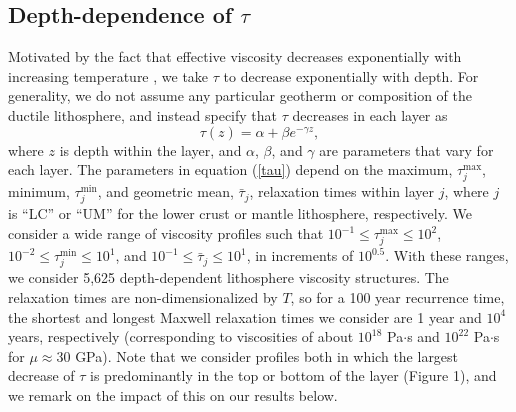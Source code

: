 \subsection{Depth-dependence of $\tau$}
Motivated by the fact that effective viscosity decreases exponentially with increasing temperature \citep[{\it e.g.},][]{Kohlstedt1995}, we take $\tau$ to decrease exponentially with depth. For generality, we do not assume any particular geotherm or composition of the ductile lithosphere, and instead specify that $\tau$ decreases in each layer as
\begin{equation}
\tau(z) = \alpha + \beta e^{-\gamma z},
\label{tau}
\end{equation}
where $z$ is depth within the layer, and $\alpha$, $\beta$, and $\gamma$ are parameters that vary for each layer.  The parameters in equation (\ref{tau}) depend on the maximum, $\tau_j^{\max}$, minimum, $\tau_j^{\min}$, and geometric mean, $\bar{\tau}_j$, relaxation times within layer $j$, where $j$ is ``LC'' or ``UM'' for the lower crust or mantle lithosphere, respectively.  We consider a wide range of viscosity profiles such that $10^{-1} \leq \tau_j^{\max} \leq 10^{2}$, $10^{-2} \leq \tau_j^{\min} \leq 10^{1}$, and $10^{-1} \leq \bar{\tau}_j \leq 10^{1}$, in increments of $10^{0.5}$.  With these ranges, we consider 5,625 depth-dependent lithosphere viscosity structures. The relaxation times are non-dimensionalized by $T$, so for a 100 year recurrence time, the shortest and longest Maxwell relaxation times we consider are 1 year and $10^{4}$ years, respectively (corresponding to viscosities of about $10^{18}$ Pa$\cdot$s and $10^{22}$ Pa$\cdot$s for $\mu \approx 30$ GPa).   Note that we consider profiles both in which the largest decrease of  $\tau$ is predominantly in the top or bottom of the layer (Figure 1), and we remark on the impact of this on our results below.

